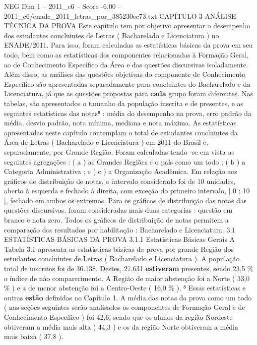 \begin{textsample}{NEG Dim 1 – 2011\_c6 – Score -6.00 – 2011\_c6/enade\_2011\_letras\_por\_385230ec73.txt}  \label{ex:f1_neg_222}
CAPÍTULO 3 ANÁLISE TÉCNICA DA PROVA Este capítulo tem por objetivo apresentar o desempenho dos estudantes concluintes de Letras ( Bacharelado e Licenciatura ) no ENADE/2011.
Para isso, foram calculadas as estatísticas básicas da prova em seu todo, bem como as estatísticas dos componentes relacionadas à Formação Geral, ao de Conhecimento Específico da Área e das questões discursivas isoladamente.
Além disso, as análises das questões objetivas do componente de Conhecimento Específico são apresentadas separadamente para concluintes do Bacharelado e da Licenciatura, já que as questões propostas para \textbf{cada} grupo foram diferentes.
Nas tabelas, são apresentados o tamanho da população inscrita e de presentes, e as seguintes estatísticas das notas⁸ : média do desempenho na prova, erro padrão da média, desvio padrão, nota mínima, mediana e nota máxima.
As estatísticas apresentadas neste capítulo contemplam o total de estudantes concluintes da Área de Letras ( Bacharelado e Licenciatura ) em 2011 do Brasil e, separadamente, por Grande Região.
Foram calculadas tendo -se em vista as seguintes agregações : ( a ) as Grandes Regiões e o país como um todo ; ( b ) a Categoria Administrativa ; e ( c ) a Organização Acadêmica.
Em relação aos gráficos de distribuição de notas, o intervalo considerado foi de 10 unidades, aberto à esquerda e fechado à direita, com exceção do primeiro intervalo, [ 0 ; 10 ], fechado em ambos os extremos.
Para os gráficos de distribuição das notas das questões discursivas, foram consideradas mais duas categorias : questão em branco e nota zero.
Todos os gráficos de distribuição de notas permitem a comparação dos resultados por habilitação : Bacharelado e Licenciatura. 3.1 ESTATÍSTICAS BÁSICAS DA PROVA 3.1.1 Estatísticas Básicas Gerais A Tabela 3.1 apresenta as estatísticas básicas da prova por grande Região dos estudantes concluintes de Letras ( Bacharelado e Licenciatura ).
A população total de inscritos foi de 36.138.
Destes, 27.631 \textbf{estiveram} presentes, sendo 23,5 \% o índice de não comparecimento.
A Região de maior abstenção foi a Norte ( 33,0 \% ) e a de menor abstenção foi a Centro-Oeste ( 16,0 \% ). ⁸ Essas estatísticas e outras \textbf{estão} definidas no Capítulo 1.
A média das notas da prova como um todo ( nas seções seguintes serão analisados os componentes de Formação Geral e de Conhecimento Específico ) foi 42,6, sendo que os alunos da região Nordeste obtiveram a média mais alta ( 44,3 ) e os da região Norte obtiveram a média mais baixa ( 37,8 ).

\end{textsample}
